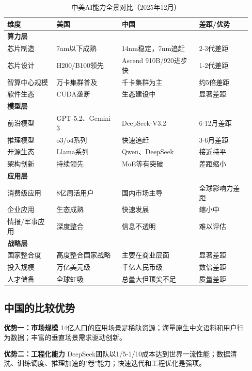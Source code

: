 \begin{table}[H]
\centering
\caption{中美AI能力全景对比（2025年12月）}
\small
\begin{tabular}{p{3cm}p{3.5cm}p{3.5cm}p{2.5cm}}
\toprule
\textbf{维度} & \textbf{美国} & \textbf{中国} & \textbf{差距/优势} \\
\midrule
\multicolumn{4}{l}{\textbf{算力层}} \\
\midrule
芯片制造 & 7nm以下成熟 & 14nm稳定，7nm追赶 & 2-3代差距 \\
芯片设计 & H200/B100领先 & Ascend 910B/920进步快 & 1-2代差距 \\
智算中心规模 & 万卡集群普及 & 千卡集群为主 & 约5倍差距 \\
软件生态 & CUDA垄断 & 生态建设中 & 显著差距 \\
\midrule
\multicolumn{4}{l}{\textbf{模型层}} \\
\midrule
前沿模型 & GPT-5.2、Gemini 3 & DeepSeek-V3.2 & 6-12月差距 \\
推理模型 & o3/o4系列 & 快速追赶 & 3-6月差距 \\
开源生态 & Llama系列 & Qwen、DeepSeek & 接近持平 \\
架构创新 & 持续领先 & MoE等有突破 & 差距缩小 \\
\midrule
\multicolumn{4}{l}{\textbf{应用层}} \\
\midrule
消费级应用 & 8亿周活用户 & 国内市场主导 & 全球影响力差距 \\
企业应用 & 生态成熟 & 快速发展 & 缩小中 \\
情报/军事应用 & 深度整合 & 信息不透明 & 难以评估 \\
\midrule
\multicolumn{4}{l}{\textbf{战略层}} \\
\midrule
国家整合度 & 高度整合国家战略 & 主要在商业层面 & 显著差距 \\
投入规模 & 万亿美元级 & 千亿人民币级 & 数倍差距 \\
人才储备 & 全球虹吸 & 总量大但顶尖不足 & 质量差距 \\
\bottomrule
\end{tabular}
\end{table}

\subsection{中国的比较优势}

\textbf{优势一：市场规模}
14亿人口的应用场景是稀缺资源；海量原生中文语料和用户行为数据；丰富的垂直场景需求驱动创新。

\textbf{优势二：工程化能力}
DeepSeek团队以1/5-1/10成本达到世界一流性能；数据清洗、训练调度、推理加速的"卷"能力；快速迭代和工程优化是强项。

